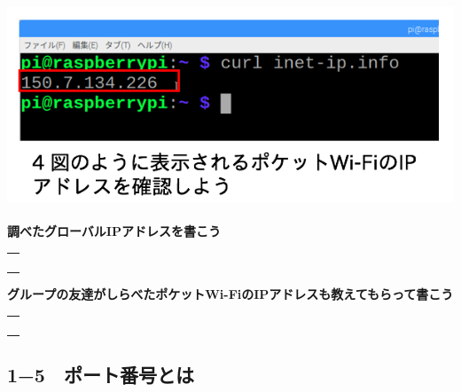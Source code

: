 \documentclass[a4paper,12pt,dvipdfmx]{jarticle}
\begin{document}
\centering
\includegraphics[width=13.85cm,height=6.052cm]{ome7-img019.png}
\flushleft


\bigskip


\bigskip

{\bfseries
	調べたグローバルIPアドレスを書こう}


\bigskip


\centering
\begin{tabular}{|p{}|} \hline
	\\
	\\
	\\
	\\ \hline
\end{tabular}


\flushleft




\bigskip


\bigskip

{\bfseries
	グループの友達がしらべたポケットWi-FiのIPアドレスも教えてもらって書こう}



\bigskip


\centering
\begin{tabular}{|p{}|} \hline
	\\
	\\
	\\
	\\ \hline
\end{tabular}


\flushleft



\bigskip


\bigskip

\clearpage\subsection*{1−5　ポート番号とは}
\end{document}
